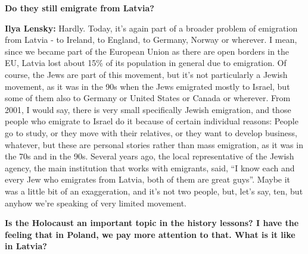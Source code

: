 \textbf{Do they still emigrate from Latvia?} 

\textbf{Ilya Lensky:} Hardly. Today, it’s again part of a broader problem of emigration from Latvia - to Ireland, to England, to Germany, Norway or wherever. I mean, since we became part of the European Union as there are open borders in the EU, Latvia lost about 15\% of its population in general due to emigration. Of course, the Jews are part of this movement, but it’s not particularly a Jewish movement, as it was in the 90s when the Jews emigrated mostly to Israel, but some of them also to Germany or United States or Canada or wherever. From 2001, I would say, there is very small specifically Jewish emigration, and those people who emigrate to Israel do it because of certain individual reasons: People go to study, or they move with their relatives, or they want to develop business, whatever, but these are personal stories rather than mass emigration, as it was in the 70s and in the 90s. Several years ago, the local representative of the Jewish agency, the main institution that works with emigrants, said, ``I know each and every Jew who emigrates from Latvia, both of them are great guys''. Maybe it was a little bit of an exaggeration, and it's not two people, but, let’s say, ten, but anyhow we’re speaking of very limited movement. 

\textbf{Is the Holocaust an important topic in the history lessons? I have the feeling that in Poland, we pay more attention to that. What is it like in Latvia?} 

